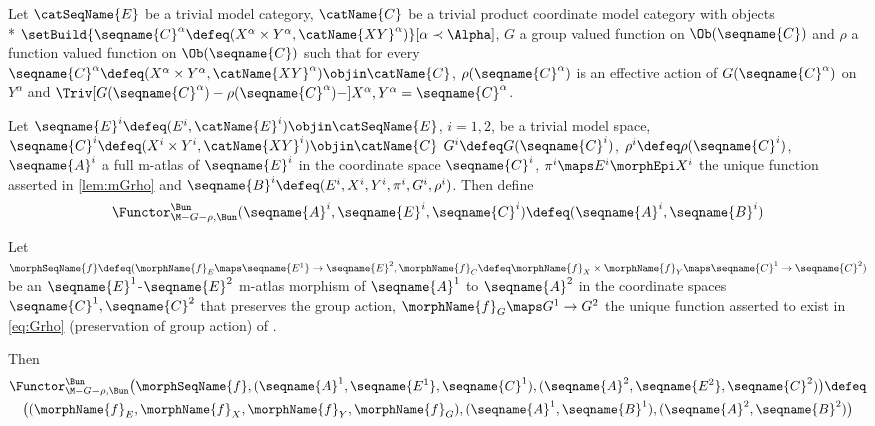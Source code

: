 \documentclass{article}
\begin{document}
\begin{definition}
\label{def:FuncMtoBun}
Let $\catSeqName{E}$ be a trivial model category, $\catName{C}$ be a
trivial product coordinate model category with objects \\*
$
\setBuild
  {
    \seqname{C}^\alpha \defeq
    (X^\alpha \times Y^\alpha, \catName{XY}^\alpha)
  }%
  [\alpha \prec \Alpha]
$,
$G$ a group valued function on $\Ob(\seqname{C})$ and $\rho$ a function
valued function on $\Ob(\seqname{C})$ such that for every
$
  \seqname{C}^\alpha \defeq
  (X^\alpha \times Y^\alpha, \catName{XY}^\alpha) \objin \catName{C}
$,
$\rho(\seqname{C}^\alpha)$ is an effective action of
$G(\seqname{C}^\alpha)$ on $Y^\alpha$ and
$
\Triv%
  [
    G(\seqname{C}^\alpha)-\rho(\seqname{C}^\alpha)-
  ]
  {X^\alpha, Y^\alpha} =
  \seqname{C}^\alpha
$.

Let $\seqname{E}^i \defeq (E^i, \catName{E}^i) \objin \catSeqName{E}$,
$i=1,2$, be a trivial model space,
$
  \seqname{C}^i \defeq (X^i \times Y^i, \catName{XY}^i)
  \objin \catName{C}
$
$G^i \defeq G(\seqname{C}^i)$, $\rho^i \defeq \rho(\seqname{C}^i)$,
$\seqname{A}^i$ a full m-atlas of $\seqname{E}^i$ in the coordinate
space $\seqname{C}^i$,
$\pi^i \maps E^i \morphEpi X^i$ the unique function asserted in
\cref{lem:mGrho} and
$
  \seqname{B}^i \defeq
    (
      E^i,
      X^i,
      Y^i,
      \pi^i,
      G^i,
      \rho^i
    )
$.
Then define
\begin{equation}
\Functor^\Bun_{\M-G-\rho,\Bun}
(\seqname{A}^i, \seqname{E}^i, \seqname{C}^i)
\defeq
(\seqname{A}^i, \seqname{B}^i)
\end{equation}

Let
$
  \morphSeqName{f} \defeq
  (
    \morphName{f}_E \maps \seqname{E^1} \to \seqname{E}^2,
    \morphName{f}_C \defeq \morphName{f}_X \times \morphName{f}_Y \maps
    \seqname{C}^1 \to \seqname{C}^2
  )
$
be an $\seqname{E}^1$-$\seqname{E}^2$ m-atlas morphism of
$\seqname{A}^1$ to $\seqname{A}^2$ in the coordinate spaces
$\seqname{C}^1, \seqname{C}^2$ that preserves the group action,
$\morphName{f}_G \maps G^1 \to G^2$ the unique function asserted to exist
in \cref{eq:Grho} (preservation of group action) of
.

Then
\begin{multline}
\Functor^\Bun_{\M-G-\rho,\Bun}
  \bigl (
    \morphSeqName{f},
    (\seqname{A}^1, \seqname{E^1}, \seqname{C}^1),
    (\seqname{A}^2, \seqname{E^2}, \seqname{C}^2)
  \bigr )
\defeq \\
  \bigl (
    (\morphName{f}_E, \morphName{f}_X, \morphName{f}_Y, \morphName{f}_G),
    (\seqname{A}^1, \seqname{B}^1),
    (\seqname{A}^2, \seqname{B}^2)
  \bigr )
\end{multline}
\end{definition}
\end{document}
